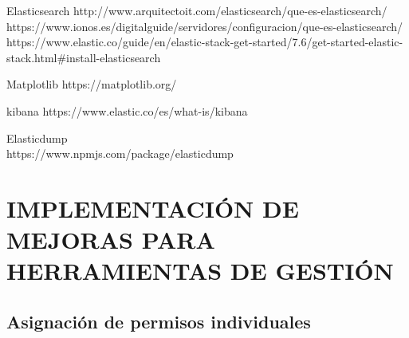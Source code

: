 \documentclass[11pt,a4paper]{book}
\begin{document}
	Elasticsearch
	http://www.arquitectoit.com/elasticsearch/que-es-elasticsearch/
	https://www.ionos.es/digitalguide/servidores/configuracion/que-es-elasticsearch/
	https://www.elastic.co/guide/en/elastic-stack-get-started/7.6/get-started-elastic-stack.html\#install-elasticsearch
	
	Matplotlib
	https://matplotlib.org/
	
	kibana
	https://www.elastic.co/es/what-is/kibana

	Elasticdump\\
	https://www.npmjs.com/package/elasticdump
	\chapter{IMPLEMENTACIÓN DE MEJORAS PARA HERRAMIENTAS DE GESTIÓN}
		\section{Asignación de permisos individuales}
\end{document}
